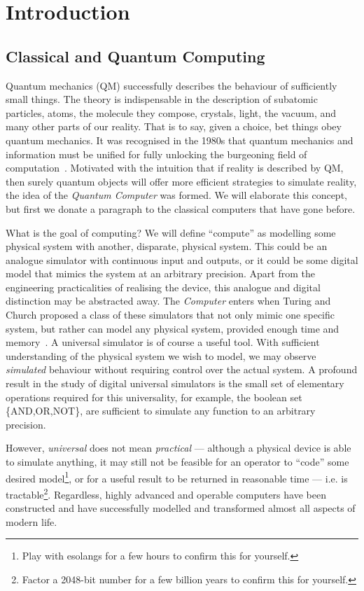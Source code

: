 \chapter{Introduction}
\label{ch:intro}
\minitoc

\section{Classical and Quantum Computing}
Quantum mechanics (QM) successfully describes the behaviour of sufficiently small things.
The theory is indispensable in the description of subatomic particles, atoms, the
molecule they compose, crystals, light, the vacuum, and many other parts of our
reality. That is to say, given a choice, bet things obey quantum mechanics. 
It was recognised in the 1980s that quantum mechanics and information must be unified for fully unlocking the burgeoning field of computation~\cite{benioff_computer_1980, feynman_simulating_1982}. Motivated with the intuition that if reality is described by QM, then surely
quantum objects will offer more efficient strategies to simulate reality, the idea of the \emph{Quantum Computer} was formed. We will elaborate this concept, but first 
we donate a paragraph to the classical computers that have gone before.

What is the goal of computing? We will define ``compute'' as modelling some physical system with another,
disparate, physical system. This could be an analogue simulator with continuous
input and outputs, or it could be some digital model that mimics the system at
an arbitrary precision. Apart from the engineering practicalities of realising
the device, this analogue and digital distinction may be abstracted away. The
\emph{Computer} enters when Turing and Church proposed a class of these simulators that not
only mimic one specific system, but rather can model any physical system,
provided enough time and memory~\cite{turing_computable_1937, church_unsolvable_1936}. A universal simulator is of course a
useful tool. With sufficient understanding of the physical system we wish to model, we
may observe \emph{simulated} behaviour without requiring control over the actual
system. 
A profound result in the study of digital universal simulators is the small set of elementary operations required for this universality, for example, the boolean set \{AND,OR,NOT\}, are sufficient to simulate any function to an arbitrary precision.

However, \emph{universal} does not mean \emph{practical} ---  although a physical device
is able to simulate anything, it may still not be feasible for an operator to ``code''
some desired model\footnote{Play with esolangs for a few hours to confirm this
for yourself.}, or for a useful result to be returned in reasonable
time --- i.e. is tractable\footnote{Factor a 2048-bit number for a few billion years to confirm this for
yourself.}. Regardless, highly advanced and operable computers have been
constructed and have successfully modelled and transformed almost all aspects
of modern life. 

